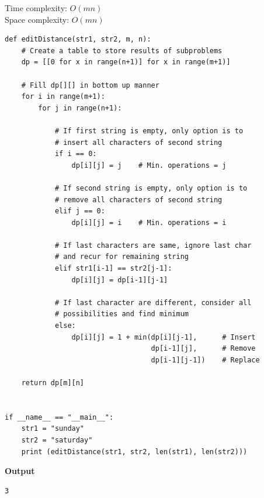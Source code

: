 \documentclass[a4paper,11pt]{book}
\begin{document}
\noindent Time complexity: $O(mn)$\\
\noindent Space complexity: $O(mn)$

\begin{lstlisting}
def editDistance(str1, str2, m, n):
    # Create a table to store results of subproblems
    dp = [[0 for x in range(n+1)] for x in range(m+1)]
 
    # Fill dp[][] in bottom up manner
    for i in range(m+1):
        for j in range(n+1):
 
            # If first string is empty, only option is to
            # insert all characters of second string
            if i == 0:
                dp[i][j] = j    # Min. operations = j
 
            # If second string is empty, only option is to
            # remove all characters of second string
            elif j == 0:
                dp[i][j] = i    # Min. operations = i
 
            # If last characters are same, ignore last char
            # and recur for remaining string
            elif str1[i-1] == str2[j-1]:
                dp[i][j] = dp[i-1][j-1]
 
            # If last character are different, consider all
            # possibilities and find minimum
            else:
                dp[i][j] = 1 + min(dp[i][j-1],      # Insert
                                   dp[i-1][j],      # Remove
                                   dp[i-1][j-1])    # Replace
 
    return dp[m][n]
 
 
if __name__ == "__main__":
    str1 = "sunday"
    str2 = "saturday"
    print (editDistance(str1, str2, len(str1), len(str2)))
\end{lstlisting}
\textbf{Output}
\begin{lstlisting}
3
\end{lstlisting}
\end{document}
